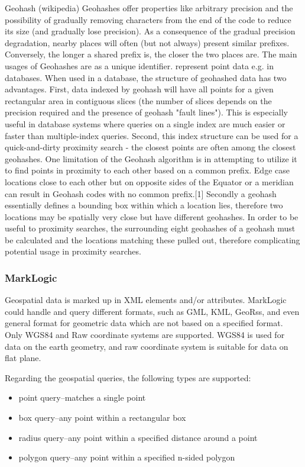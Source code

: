 \documentclass[a4paper,12pt]{article}
\begin{document}
Geohash (wikipedia)
Geohashes offer properties like arbitrary precision and the possibility of gradually removing characters from the end of the code to reduce its size (and gradually lose precision).
As a consequence of the gradual precision degradation, nearby places will often (but not always) present similar prefixes. Conversely, the longer a shared prefix is, the closer the two places are.
The main usages of Geohashes are
as a unique identifier.
represent point data e.g. in databases.
When used in a database, the structure of geohashed data has two advantages. First, data indexed by geohash will have all points for a given rectangular area in contiguous slices (the number of slices depends on the precision required and the presence of geohash "fault lines"). This is especially useful in database systems where queries on a single index are much easier or faster than multiple-index queries. Second, this index structure can be used for a quick-and-dirty proximity search - the closest points are often among the closest geohashes.
One limitation of the Geohash algorithm is in attempting to utilize it to find points in proximity to each other based on a common prefix. Edge case locations close to each other but on opposite sides of the Equator or a meridian can result in Geohash codes with no common prefix.[1]
Secondly a geohash essentially defines a bounding box within which a location lies, therefore two locations may be spatially very close but have different geohashes. In order to be useful to proximity searches, the surrounding eight geohashes of a geohash must be calculated and the locations matching these pulled out, therefore complicating potential usage in proximity searches.

\subsubsection{MarkLogic}
Geospatial data is marked up in XML elements and/or attributes. MarkLogic could handle and query different formats, such as GML, KML, GeoRss, and even general format for geometric data which are not based on a specified format. Only WGS84 and Raw coordinate systems are supported. WGS84 is used for data on the earth geometry, and raw coordinate system is suitable for data on flat plane.

Regarding the geospatial queries, the following types are supported:
\begin{itemize}
\item point query--matches a single point
\item box query--any point within a rectangular box
\item radius query--any point within a specified distance around a point
\item polygon query--any point within a specified n-sided polygon
\end{itemize}
\end{document}
